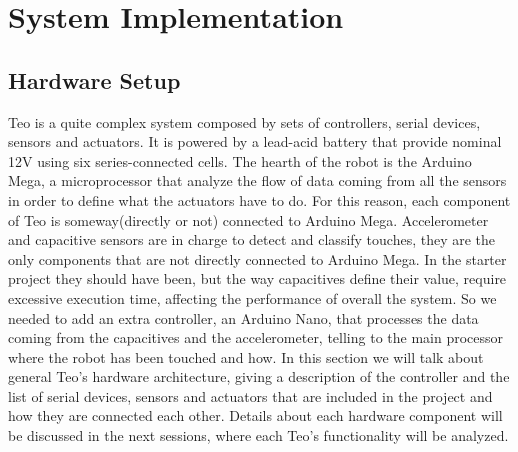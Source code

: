 \chapter{System Implementation}
\label{chapter5}
\ifpdf
\graphicspath{{Chapter5/Figs/Raster/}{Chapter5/Figs/PDF/}{Chapter5/Figs/}}
\else
\graphicspath{{Chapter5/Figs/Vector/}{Chapter5/Figs/}}
\fi

\section{Hardware Setup}

Teo is a quite complex system composed by sets of controllers, serial devices, sensors and actuators. It is powered by a lead-acid battery that provide nominal 12V using six series-connected cells.
The hearth of the robot is the Arduino Mega, a microprocessor that analyze the flow of data coming from all the sensors in order to define what the actuators have to do. For this reason, each component of Teo is someway(directly or not) connected to Arduino Mega. Accelerometer and capacitive sensors are in charge to detect and classify touches, they are the only components that are not directly connected to Arduino Mega. In the starter project they should have been, but the way capacitives define their value, require excessive execution time, affecting the performance of overall the system. So we needed to add an extra controller, an Arduino Nano, that processes the data coming from the capacitives and the accelerometer, telling to the main processor where the robot has been touched and how.
In this section we will talk about general Teo's hardware architecture, giving a description of the controller and the list of serial devices, sensors and actuators that are included in the project and how they are connected each other. Details about each hardware component will be discussed in the next sessions, where each Teo's functionality will be analyzed.

